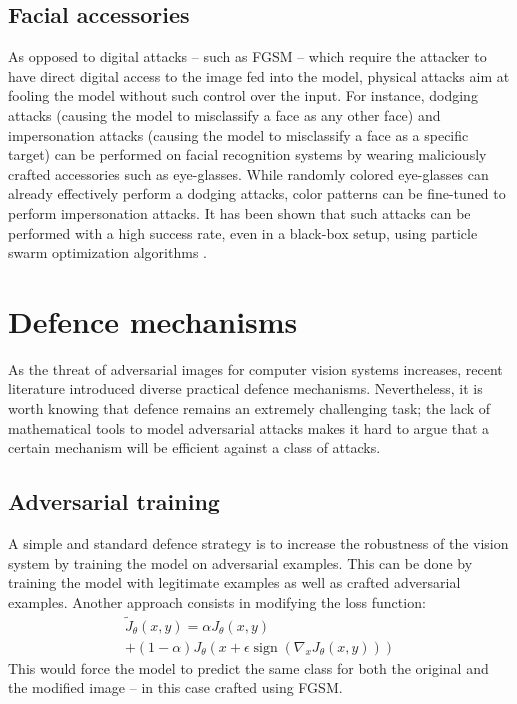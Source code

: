 \documentclass[twocolumn]{../../cs-classes/cs-classes}
\DeclareMathOperator*{\sign}{sign}
\begin{document}
\subsection{Facial accessories}
As opposed to digital attacks -- such as FGSM -- which require the attacker to have direct digital access to the image fed into the model, physical attacks \cite{kurakin2018adversarial} aim at fooling the model without such control over the input. For instance, dodging attacks (causing the model to misclassify a face as any other face) and impersonation attacks (causing the model to misclassify a face as a specific target) can be performed on facial recognition systems by wearing maliciously crafted accessories such as eye-glasses. While randomly colored eye-glasses can already effectively perform a dodging attacks, color patterns can be fine-tuned to perform impersonation attacks. It has been shown that such attacks can be performed with a high success rate, even in a black-box setup, using particle swarm optimization algorithms \cite{sharif2016accessorize}.

\section{Defence mechanisms}
As the threat of adversarial images for computer vision systems increases, recent literature introduced diverse practical defence mechanisms. Nevertheless, it is worth knowing that defence remains an extremely challenging task; the lack of mathematical tools to model adversarial attacks makes it hard to argue that a certain mechanism will be efficient against a class of attacks.

\subsection{Adversarial training}
A simple and standard defence strategy is to increase the robustness of the vision system by training the model on adversarial examples. This can be done by training the model with legitimate examples as well as crafted adversarial examples. Another approach \cite{goodfellow2014explaining} consists in modifying the loss function:
\begin{multline*}
    \tilde{J}_\theta(x, y) = \alpha J_\theta(x, y) \\+ (1-\alpha)J_\theta\left(x+\epsilon\sign\left(\nabla_x J_\theta(x, y)\right)\right)
\end{multline*}
This would force the model to predict the same class for both the original and the modified image -- in this case crafted using FGSM.
\end{document}
